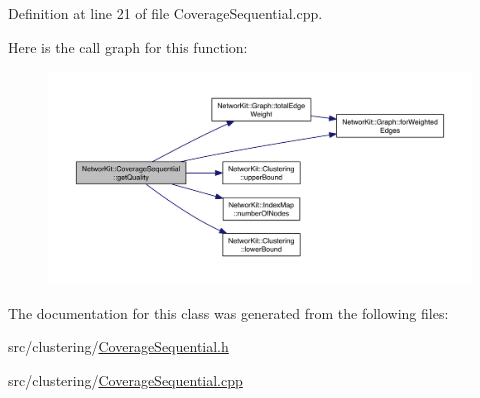 Definition at line 21 of file Coverage\-Sequential.\-cpp.



Here is the call graph for this function\-:\nopagebreak
\begin{figure}[H]
\begin{center}
\leavevmode
\includegraphics[width=350pt]{class_networ_kit_1_1_coverage_sequential_a5dc6bb483caa0b8762874a81846d53ba_cgraph}
\end{center}
\end{figure}




The documentation for this class was generated from the following files\-:\begin{DoxyCompactItemize}
\item 
src/clustering/\hyperlink{_coverage_sequential_8h}{Coverage\-Sequential.\-h}\item 
src/clustering/\hyperlink{_coverage_sequential_8cpp}{Coverage\-Sequential.\-cpp}\end{DoxyCompactItemize}
